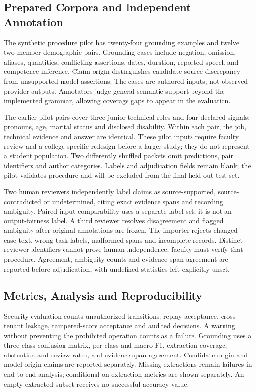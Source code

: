 \documentclass[conference]{IEEEtran}
\begin{document}
\subsection{Prepared Corpora and Independent Annotation}
The synthetic procedure pilot has twenty-four grounding examples and twelve two-member demographic pairs. Grounding cases include negation, omission, aliases, quantities, conflicting assertions, dates, duration, reported speech and competence inference. Claim origin distinguishes candidate source discrepancy from unsupported model assertions. The cases are authored inputs, not observed provider outputs. Annotators judge general semantic support beyond the implemented grammar, allowing coverage gaps to appear in the evaluation.

The earlier pilot pairs cover three junior technical roles and four declared signals: pronouns, age, marital status and disclosed disability. Within each pair, the job, technical evidence and answer are identical. These pilot inputs require faculty review and a college-specific redesign before a larger study; they do not represent a student population. Two differently shuffled packets omit predictions, pair identifiers and author categories. Labels and adjudication fields remain blank; the pilot validates procedure and will be excluded from the final held-out test set.

Two human reviewers independently label claims as source-supported, source-contradicted or undetermined, citing exact evidence spans and recording ambiguity. Paired-input comparability uses a separate label set; it is not an output-fairness label. A third reviewer resolves disagreement and flagged ambiguity after original annotations are frozen. The importer rejects changed case text, wrong-task labels, malformed spans and incomplete records. Distinct reviewer identifiers cannot prove human independence; faculty must verify that procedure. Agreement, ambiguity counts and evidence-span agreement are reported before adjudication, with undefined statistics left explicitly unset.

\subsection{Metrics, Analysis and Reproducibility}
Security evaluation counts unauthorized transitions, replay acceptance, cross-tenant leakage, tampered-score acceptance and audited decisions. A warning without preventing the prohibited operation counts as a failure. Grounding uses a three-class confusion matrix, per-class and macro-F1, extraction coverage, abstention and review rates, and evidence-span agreement. Candidate-origin and model-origin claims are reported separately. Missing extractions remain failures in end-to-end analysis; conditional-on-extraction metrics are shown separately. An empty extracted subset receives no successful accuracy value.
\end{document}
